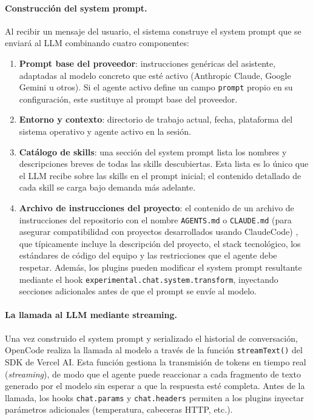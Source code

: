 \documentclass[11pt, letterpaper]{article}
\begin{document}
\paragraph{Construcción del system prompt.}
Al recibir un mensaje del usuario, el sistema construye el system prompt que se enviará al LLM combinando cuatro componentes:
\begin{enumerate}
    \item \textbf{Prompt base del proveedor}: instrucciones genéricas del asistente, adaptadas al modelo concreto que esté activo (Anthropic Claude, Google Gemini u otros). Si el agente activo define un campo \texttt{prompt} propio en su configuración, este sustituye al prompt base del proveedor.
    \item \textbf{Entorno y contexto}: directorio de trabajo actual, fecha, plataforma del sistema operativo y agente activo en la sesión.
    \item \textbf{Catálogo de skills}: una sección del system prompt lista los nombres y descripciones breves de todas las skills descubiertas. Esta lista es lo único que el LLM recibe sobre las skills en el prompt inicial; el contenido detallado de cada skill se carga bajo demanda más adelante.
    \label{concepto:archivo_instrucciones}
    \item \textbf{Archivo de instrucciones del proyecto}: el contenido de un archivo de instrucciones del repositorio con el nombre \texttt{AGENTS.md} o  \texttt{CLAUDE.md} (para asegurar compatibilidad con proyectos desarrollados usando ClaudeCode) , que típicamente incluye la descripción del proyecto, el stack tecnológico, los estándares de código del equipo y las restricciones que el agente debe respetar. Además, los plugins pueden modificar el system prompt resultante mediante el hook \texttt{experimental.chat.system.transform}, inyectando secciones adicionales antes de que el prompt se envíe al modelo.
\end{enumerate}

\paragraph{La llamada al LLM mediante streaming.}
Una vez construido el system prompt y serializado el historial de conversación, OpenCode realiza la llamada al modelo a través de la función \texttt{streamText()} del SDK de Vercel AI. Esta función gestiona la transmisión de tokens en tiempo real (\textit{streaming}), de modo que el agente puede reaccionar a cada fragmento de texto generado por el modelo sin esperar a que la respuesta esté completa. Antes de la llamada, los hooks \texttt{chat.params} y \texttt{chat.headers} permiten a los plugins inyectar parámetros adicionales (temperatura, cabeceras HTTP, etc.).
\end{document}
